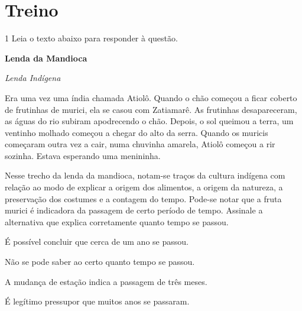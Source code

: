 
\section*{Treino}

\num{1} Leia o texto abaixo para responder à questão.

\begin{myquote}

\textbf{Lenda da Mandioca}

\emph{Lenda Indígena}

Era uma vez uma índia chamada Atiolô. Quando o chão começou a ficar
coberto de frutinhas de murici, ela se casou com Zatiamarê. As frutinhas
desapareceram, as águas do rio subiram apodrecendo o chão. Depois, o sol
queimou a terra, um ventinho molhado começou a chegar do alto da serra.
Quando os muricis começaram outra vez a cair, numa chuvinha amarela,
Atiolô começou a rir sozinha. Estava esperando uma menininha.


\end{myquote}

Nesse trecho da lenda da mandioca, notam-se traços da cultura
indígena com relação ao modo de explicar a origem dos alimentos, a
origem da natureza, a preservação dos costumes e a contagem do tempo.
Pode-se notar que a fruta murici é indicadora da passagem de certo 
período de tempo. Assinale a alternativa que explica corretamente 
quanto tempo se passou.

\begin{escolha}

  \item É possível concluir que cerca de um ano se passou.
  
  \item Não se pode saber ao certo quanto tempo se passou.
  
  \item A mudança de estação indica a passagem de três meses.
  
  \item É legítimo pressupor que muitos anos se passaram. 

\end{escolha}

